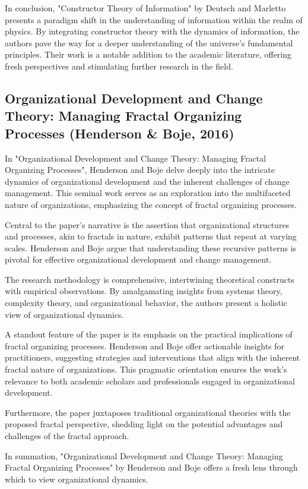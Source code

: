 \documentclass[sn-nature]{sn-jnl}%
\theoremstyle{thmstyleone}%
\theoremstyle{thmstyletwo}%
\theoremstyle{thmstylethree}%
\begin{document}
In conclusion, "Constructor Theory of Information" by Deutsch and Marletto presents a paradigm shift in the understanding of information within the realm of physics. By integrating constructor theory with the dynamics of information, the authors pave the way for a deeper understanding of the universe's fundamental principles. Their work is a notable addition to the academic literature, offering fresh perspectives and stimulating further research in the field.
\subsection{Organizational Development and Change Theory: Managing Fractal Organizing Processes (Henderson \& Boje, 2016)\cite{henderson_organizational_2016}}

In "Organizational Development and Change Theory: Managing Fractal Organizing Processes", Henderson and Boje delve deeply into the intricate dynamics of organizational development and the inherent challenges of change management. This seminal work serves as an exploration into the multifaceted nature of organizations, emphasizing the concept of fractal organizing processes.

Central to the paper's narrative is the assertion that organizational structures and processes, akin to fractals in nature, exhibit patterns that repeat at varying scales. Henderson and Boje argue that understanding these recursive patterns is pivotal for effective organizational development and change management.

The research methodology is comprehensive, intertwining theoretical constructs with empirical observations. By amalgamating insights from systems theory, complexity theory, and organizational behavior, the authors present a holistic view of organizational dynamics.

A standout feature of the paper is its emphasis on the practical implications of fractal organizing processes. Henderson and Boje offer actionable insights for practitioners, suggesting strategies and interventions that align with the inherent fractal nature of organizations. This pragmatic orientation ensures the work's relevance to both academic scholars and professionals engaged in organizational development.

Furthermore, the paper juxtaposes traditional organizational theories with the proposed fractal perspective, shedding light on the potential advantages and challenges of the fractal approach.

In summation, "Organizational Development and Change Theory: Managing Fractal Organizing Processes" by Henderson and Boje offers a fresh lens through which to view organizational dynamics.  
\end{document}
